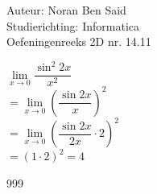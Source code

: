\documentclass[a4paper]{article}
\begin{document}
\noindent \large Auteur: Noran Ben Said\\
\noindent \large Studierichting: Informatica\\
\noindent \large Oefeningenreeks 2D nr. 14.11 \\

\medskip
\normalsize

$ \lim\limits_{x \to 0} \dfrac{\sin^2 2x}{x^2}$\\

$ = \lim\limits_{x \to 0} \left( \dfrac{\sin 2x}{x} \right)^2$\\

$ = \lim\limits_{x \to 0} \left( \dfrac{\sin 2x}{2x} \cdot 2 \right)^2$\\

$ = (1 \cdot 2)^2 = 4$



\begin{thebibliography}{999}
\end{thebibliography}
\end{document}
